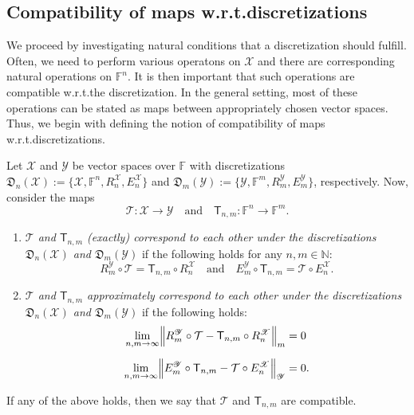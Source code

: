 \documentclass[a4paper]{paper}
\newcommand{\discr}{\mathfrak{D}}
\newcommand{\VecSpace}[1]{\mathscr{#1}}
\newcommand{\Field}{\mathbb{F}}
\newcommand{\Natural}{\mathbb{N}}
\newcommand{\Op}[1]{\mathcal{#1}}
\newcommand{\DiscOp}[1]{\mathsf{#1}}
\begin{document}
\subsection{Compatibility of maps w.r.t.\@ discretizations}
We proceed by investigating natural conditions that a discretization should fulfill. Often, 
we need to perform various operatons on $\VecSpace{X}$ and there are corresponding natural 
operations on $\Field^{n}$. It is then important that such operations are compatible w.r.t.\@ the discretization. 
In the general setting, most of these operations can be stated as maps between appropriately chosen vector 
spaces. Thus, we begin with defining the notion of compatibility of maps w.r.t.\@ discretizations. 
\begin{definition}\label{def:MapComp}
  Let $\VecSpace{X}$ and $\VecSpace{Y}$ be vector spaces over $\Field$ with discretizations 
  $\discr_{n}(\VecSpace{X}):=\{\VecSpace{X}, \Field^{n},R^{\VecSpace{X}}_{n},E^{\VecSpace{X}}_{n} \}$ and 
  $\discr_{m}(\VecSpace{Y}):=\{ \VecSpace{Y}, \Field^{m},R^{\VecSpace{Y}}_{m},E^{\VecSpace{Y}}_{m}\}$,   
  respectively. Now, consider the maps 
  \[  \Op{T} \colon \VecSpace{X} \to \VecSpace{Y}   \quad\text{and}\quad    
      \DiscOp{T}_{n,m} \colon \Field^{n} \to \Field^{m}.   \]
  \begin{enumerate}
  \item \emph{$\Op{T}$ and $\DiscOp{T}_{n,m}$ (exactly) correspond to each 
  other under the discretizations $\discr_{n}(\VecSpace{X})$ and  $\discr_{m}(\VecSpace{Y})$} if 
  the following holds for any $n,m \in \Natural$:
  \[ R^{\VecSpace{Y}}_{m} \circ \Op{T} = \DiscOp{T}_{n,m} \circ R^{\VecSpace{X}}_{n}
     \quad\text{and}\quad
     E^{\VecSpace{Y}}_{m} \circ \DiscOp{T}_{n,m} = \Op{T} \circ E_{n}^{\VecSpace{X}}.
  \]
  \item \emph{$\Op{T}$ and $\DiscOp{T}_{n,m}$ approximately correspond to 
  each other under the discretizations $\discr_{n}(\VecSpace{X})$  and  $\discr_{m}(\VecSpace{Y})$}
  if the following holds:
  \begin{align*} 
    \lim_{n,m\to \infty} 
       \Bigl\Vert R_{m}^{\VecSpace{Y}} \circ \Op{T} - \DiscOp{T}_{n,m} \circ R^{\VecSpace{X}}_{n} \Bigr\Vert_{m} &= 0 
     \\[0.5em]
     \lim_{n,m\to \infty} 
       \Bigl\Vert E^{\VecSpace{Y}}_{m} \circ \DiscOp{T}_{n,m} - \Op{T} \circ E_{n}^{\VecSpace{X}} 
       \Bigr\Vert_{\VecSpace{Y}} &= 0.
  \end{align*} 
  \end{enumerate}  
  If any of the above holds, then we say that $\Op{T}$ and $\DiscOp{T}_{n,m}$ are compatible.
\end{definition}
\end{document}
